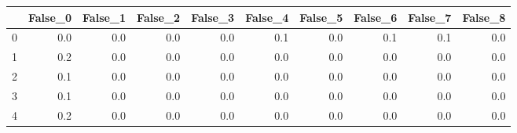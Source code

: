 \begin{tabular}{lrrrrrrrrr}
\toprule
{} &  False\_0 &  False\_1 &  False\_2 &  False\_3 &  False\_4 &  False\_5 &  False\_6 &  False\_7 &  False\_8 \\ \hline
\midrule
0 &      0.0 &      0.0 &      0.0 &      0.0 &      0.1 &      0.0 &      0.1 &      0.1 &      0.0 \\ \hline
1 &      0.2 &      0.0 &      0.0 &      0.0 &      0.0 &      0.0 &      0.0 &      0.0 &      0.0 \\ \hline
2 &      0.1 &      0.0 &      0.0 &      0.0 &      0.0 &      0.0 &      0.0 &      0.0 &      0.0 \\ \hline
3 &      0.1 &      0.0 &      0.0 &      0.0 &      0.0 &      0.0 &      0.0 &      0.0 &      0.0 \\ \hline
4 &      0.2 &      0.0 &      0.0 &      0.0 &      0.0 &      0.0 &      0.0 &      0.0 &      0.0 \\ \hline
\bottomrule
\end{tabular}
